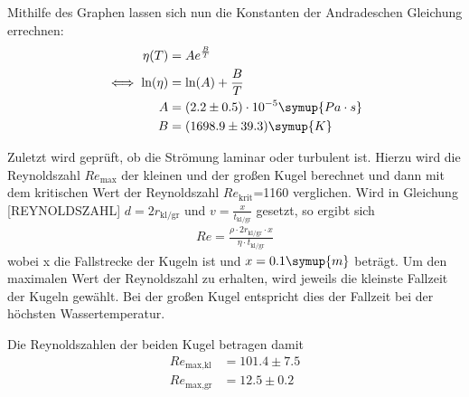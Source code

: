 Mithilfe des Graphen lassen sich nun die Konstanten der 
Andradeschen Gleichung errechnen:
\begin{equation*}
\begin{aligned}
\eta(T) &= Ae^{\frac{B}{T}} \\
\iff \text{ln}(\eta) &= \text{ln}(A) + \frac{B}{T} \\
A &= (2.2 \pm 0.5)\cdot 10^{-5} \symup{Pa \cdot s} \\
B &= (1698.9 \pm 39.3) \symup{K} \\
\end{aligned}
\end{equation*}

\newpage
Zuletzt wird geprüft, ob die Strömung laminar oder turbulent ist. Hierzu wird die Reynoldszahl $Re_{\text{max}}$ der kleinen und der großen Kugel berechnet und dann mit dem kritischen Wert der 
Reynoldszahl $Re_{\text{krit}}$=1160 verglichen.
Wird in Gleichung [REYNOLDSZAHL] $d=2r_{\text{kl/gr}}$ und $v=\frac{x}{t_{\text{kl/gr}}}$ gesetzt, so ergibt sich
\begin{equation}
\begin{aligned}
Re = \frac{\rho \cdot 2r_{\text{kl/gr}} \cdot x}{\eta \cdot t_{\text{kl/gr}}}
\end{aligned}
\end{equation}
wobei x die Fallstrecke der Kugeln ist und $x=0.1\symup{m}$ \cite[3]{anleitung107} beträgt. Um den maximalen Wert der Reynoldszahl zu erhalten, wird jeweils die kleinste Fallzeit der Kugeln gewählt. Bei der 
großen Kugel entspricht dies der Fallzeit bei der höchsten Wassertemperatur.

Die Reynoldszahlen der beiden Kugel betragen damit
\begin{equation*}
\begin{aligned}
Re_{\text{max,kl}} &= 101.4 \pm 7.5 \\
Re_{\text{max,gr}} &= 12.5 \pm 0.2
\end{aligned}
\end{equation*}

